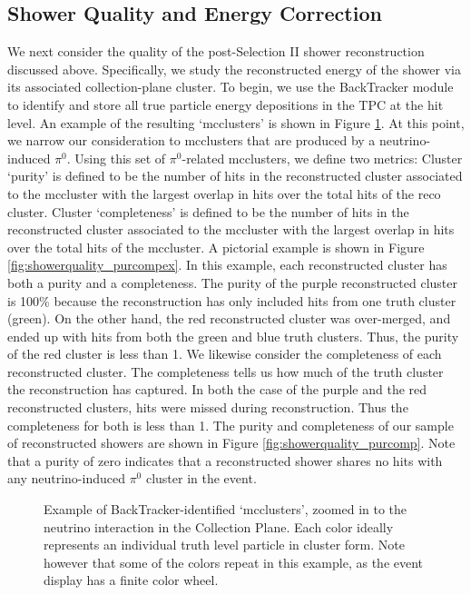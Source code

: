 \documentclass{article}
\begin{document}
\subsection{Shower Quality and Energy Correction}
We next consider the quality of the post-Selection II shower reconstruction discussed above.  Specifically, we study the reconstructed energy of the shower via its associated collection-plane cluster. To begin, we use the BackTracker module to identify and store all true particle energy depositions in the TPC at the hit level.  An example of the resulting `mcclusters' is shown in Figure \ref{fig:mcclusters}. At this point, we narrow our consideration to mcclusters that are produced by a neutrino-induced $\pi^0$. Using this set of $\pi^0$-related mcclusters, we define two metrics: Cluster `purity' is defined to be the number of hits in the reconstructed cluster associated to the mccluster with the largest overlap in hits over the total hits of the reco cluster. Cluster `completeness' is defined to be the number of hits in the reconstructed cluster associated to the mccluster with the largest overlap in hits over the total hits of the mccluster. A pictorial example is shown in Figure \ref{fig:showerquality_purcompex}. In this example, each reconstructed cluster has both a purity and a completeness.  The purity of the purple reconstructed cluster is 100\% because the reconstruction has only included hits from one truth cluster (green). On the other hand, the red reconstructed cluster was over-merged, and ended up with hits from both the green and blue truth clusters.  Thus, the purity of the red cluster is less than 1. We likewise consider the completeness of each reconstructed cluster. The completeness tells us how much of the truth cluster the reconstruction has captured.  In both the case of the purple and the red reconstructed clusters, hits were missed during reconstruction. Thus the completeness for both is less than 1.  The purity and completeness of our sample of reconstructed showers are shown in Figure \ref{fig:showerquality_purcomp}. Note that a purity of zero indicates that a reconstructed shower shares no hits with any neutrino-induced $\pi^0$ cluster in the event. 



\begin{figure}[h!]
\centering
{}
\caption{ Example of BackTracker-identified `mcclusters', zoomed in to the neutrino interaction in the Collection Plane. Each color ideally represents an individual truth level particle in cluster form. Note however that some of the colors repeat in this example, as the event display has a finite color wheel. }
\label{fig:mcclusters}
\end{figure}
\end{document}
